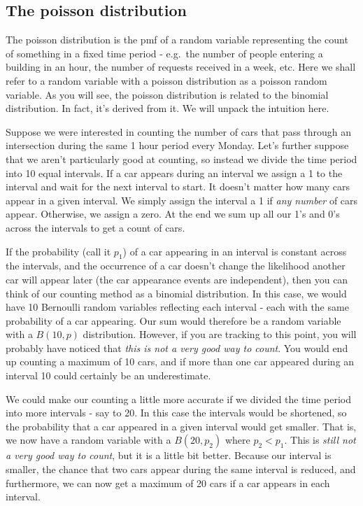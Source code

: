 \documentclass[
]{book}
\theoremstyle{definition}
\theoremstyle{definition}
\theoremstyle{definition}
\theoremstyle{definition}
\theoremstyle{remark}
\begin{document}
\subsection{The poisson distribution}\label{the-poisson-distribution}

The poisson distribution is the pmf of a random variable representing the count of something in a fixed time period - e.g.~the number of people entering a building in an hour, the number of requests received in a week, etc. Here we shall refer to a random variable with a poisson distribution as a poisson random variable. As you will see, the poisson distribution is related to the binomial distribution. In fact, it's derived from it. We will unpack the intuition here.

Suppose we were interested in counting the number of cars that pass through an intersection during the same 1 hour period every Monday. Let's further suppose that we aren't particularly good at counting, so instead we divide the time period into 10 equal intervals. If a car appears during an interval we assign a 1 to the interval and wait for the next interval to start. It doesn't matter how many cars appear in a given interval. We simply assign the interval a 1 if \emph{any number} of cars appear. Otherwise, we assign a zero. At the end we sum up all our 1's and 0's across the intervals to get a count of cars.

If the probability (call it \(p_1\)) of a car appearing in an interval is constant across the intervals, and the occurrence of a car doesn't change the likelihood another car will appear later (the car appearance events are independent), then you can think of our counting method as a binomial distribution. In this case, we would have 10 Bernoulli random variables reflecting each interval - each with the same probability of a car appearing. Our sum would therefore be a random variable with a \(B(10,p)\) distribution. However, if you are tracking to this point, you will probably have noticed that \emph{this is not a very good way to count}. You would end up counting a maximum of 10 cars, and if more than one car appeared during an interval 10 could certainly be an underestimate.

We could make our counting a little more accurate if we divided the time period into more intervals - say to 20. In this case the intervals would be shortened, so the probability that a car appeared in a given interval would get smaller. That is, we now have a random variable with a \(B(20, p_2)\) where \(p_2 < p_1\). This is \emph{still not a very good way to count}, but it is a little bit better. Because our interval is smaller, the chance that two cars appear during the same interval is reduced, and furthermore, we can now get a maximum of 20 cars if a car appears in each interval.
\end{document}
